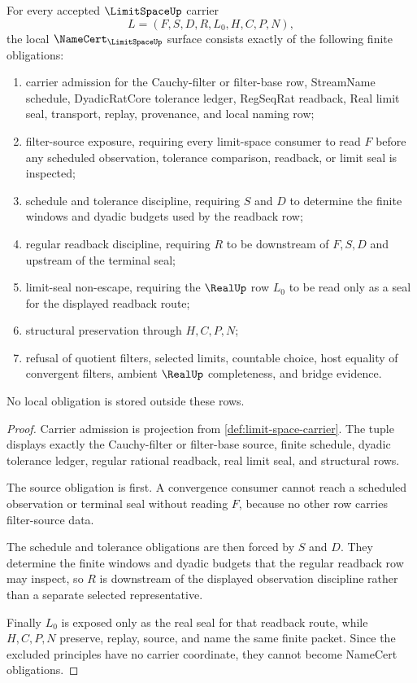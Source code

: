 \begin{theorem}
\label{thm:limit-space-namecert-obligations}
For every accepted $\LimitSpaceUp$ carrier
$$
L=(F,S,D,R,L_0,H,C,P,N),
$$
the local $\NameCert_{\LimitSpaceUp}$ surface consists exactly of the following finite obligations:
\begin{enumerate}
\item carrier admission for the Cauchy-filter or filter-base row, StreamName schedule, DyadicRatCore tolerance ledger, RegSeqRat readback, Real limit seal, transport, replay, provenance, and local naming row;
\item filter-source exposure, requiring every limit-space consumer to read $F$ before any scheduled observation, tolerance comparison, readback, or limit seal is inspected;
\item schedule and tolerance discipline, requiring $S$ and $D$ to determine the finite windows and dyadic budgets used by the readback row;
\item regular readback discipline, requiring $R$ to be downstream of $F,S,D$ and upstream of the terminal seal;
\item limit-seal non-escape, requiring the $\RealUp$ row $L_0$ to be read only as a seal for the displayed readback route;
\item structural preservation through $H,C,P,N$;
\item refusal of quotient filters, selected limits, countable choice, host equality of convergent filters, ambient $\RealUp$ completeness, and bridge evidence.
\end{enumerate}
No local obligation is stored outside these rows.
\end{theorem}
\begin{proof}
Carrier admission is projection from \autoref{def:limit-space-carrier}. The tuple displays exactly the Cauchy-filter or filter-base source, finite schedule, dyadic tolerance ledger, regular rational readback, real limit seal, and structural rows.

The source obligation is first. A convergence consumer cannot reach a scheduled observation or terminal seal without reading $F$, because no other row carries filter-source data.

The schedule and tolerance obligations are then forced by $S$ and $D$. They determine the finite windows and dyadic budgets that the regular readback row may inspect, so $R$ is downstream of the displayed observation discipline rather than a separate selected representative.

Finally $L_0$ is exposed only as the real seal for that readback route, while $H,C,P,N$ preserve, replay, source, and name the same finite packet. Since the excluded principles have no carrier coordinate, they cannot become NameCert obligations.
\end{proof}

